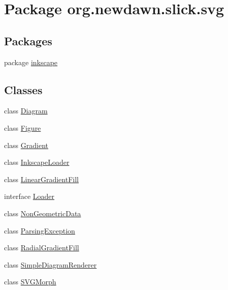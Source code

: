 \hypertarget{namespaceorg_1_1newdawn_1_1slick_1_1svg}{}\section{Package org.\+newdawn.\+slick.\+svg}
\label{namespaceorg_1_1newdawn_1_1slick_1_1svg}
\subsection*{Packages}
\begin{DoxyCompactItemize}
\item 
package \mbox{\hyperlink{namespaceorg_1_1newdawn_1_1slick_1_1svg_1_1inkscape}{inkscape}}
\end{DoxyCompactItemize}
\subsection*{Classes}
\begin{DoxyCompactItemize}
\item 
class \mbox{\hyperlink{classorg_1_1newdawn_1_1slick_1_1svg_1_1_diagram}{Diagram}}
\item 
class \mbox{\hyperlink{classorg_1_1newdawn_1_1slick_1_1svg_1_1_figure}{Figure}}
\item 
class \mbox{\hyperlink{classorg_1_1newdawn_1_1slick_1_1svg_1_1_gradient}{Gradient}}
\item 
class \mbox{\hyperlink{classorg_1_1newdawn_1_1slick_1_1svg_1_1_inkscape_loader}{Inkscape\+Loader}}
\item 
class \mbox{\hyperlink{classorg_1_1newdawn_1_1slick_1_1svg_1_1_linear_gradient_fill}{Linear\+Gradient\+Fill}}
\item 
interface \mbox{\hyperlink{interfaceorg_1_1newdawn_1_1slick_1_1svg_1_1_loader}{Loader}}
\item 
class \mbox{\hyperlink{classorg_1_1newdawn_1_1slick_1_1svg_1_1_non_geometric_data}{Non\+Geometric\+Data}}
\item 
class \mbox{\hyperlink{classorg_1_1newdawn_1_1slick_1_1svg_1_1_parsing_exception}{Parsing\+Exception}}
\item 
class \mbox{\hyperlink{classorg_1_1newdawn_1_1slick_1_1svg_1_1_radial_gradient_fill}{Radial\+Gradient\+Fill}}
\item 
class \mbox{\hyperlink{classorg_1_1newdawn_1_1slick_1_1svg_1_1_simple_diagram_renderer}{Simple\+Diagram\+Renderer}}
\item 
class \mbox{\hyperlink{classorg_1_1newdawn_1_1slick_1_1svg_1_1_s_v_g_morph}{S\+V\+G\+Morph}}
\end{DoxyCompactItemize}

